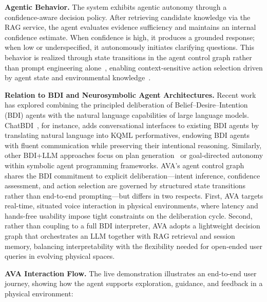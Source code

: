 \documentclass[sigconf]{aamas}
\begin{document}
\noindent\textbf{Agentic Behavior.}
The system exhibits agentic autonomy through a confidence-aware decision policy. After retrieving candidate knowledge via the RAG service, the agent evaluates evidence sufficiency and maintains an internal confidence estimate. When confidence is high, it produces a grounded response; when low or underspecified, it autonomously initiates clarifying questions. This behavior is realized through state transitions in the agent control graph rather than prompt engineering alone~\cite{embodiedagents}, enabling context-sensitive action selection driven by agent state and environmental knowledge~\cite{situatedinteraction}.

\smallskip\noindent\textbf{Relation to BDI and Neurosymbolic Agent Architectures.}
Recent work has explored combining the principled deliberation of Belief--Desire--Intention (BDI) agents with the natural language capabilities of large language models. ChatBDI~\cite{gatti2025chatbdi}, for instance, adds conversational interfaces to existing BDI agents by translating natural language into KQML performatives, endowing BDI agents with fluent communication while preserving their intentional reasoning. Similarly, other BDI+LLM approaches focus on plan generation~\cite{ichida2024bdi} or goal-directed autonomy within symbolic agent programming frameworks.
AVA's agent control graph shares the BDI commitment to explicit deliberation—intent inference, confidence assessment, and action selection are governed by structured state transitions rather than end-to-end prompting—but differs in two respects. First, AVA targets real-time, situated voice interaction in physical environments, where latency and hands-free usability impose tight constraints on the deliberation cycle. Second, rather than coupling to a full BDI interpreter, AVA adopts a lightweight decision graph that orchestrates an LLM together with RAG retrieval and session memory, balancing interpretability with the flexibility needed for open-ended user queries in evolving physical spaces.

\noindent\textbf{AVA Interaction Flow.}
The live demonstration illustrates an end-to-end user journey, showing how the agent supports exploration, guidance, and feedback in a physical environment:
\end{document}
